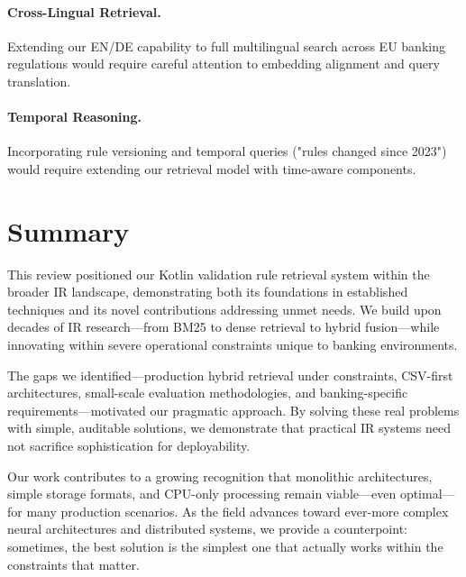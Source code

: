 \paragraph{Cross-Lingual Retrieval.} Extending our EN/DE capability to full multilingual search across EU banking regulations would require careful attention to embedding alignment and query translation.

\paragraph{Temporal Reasoning.} Incorporating rule versioning and temporal queries ("rules changed since 2023") would require extending our retrieval model with time-aware components.

\section{Summary}

This review positioned our Kotlin validation rule retrieval system within the broader IR landscape, demonstrating both its foundations in established techniques and its novel contributions addressing unmet needs. We build upon decades of IR research—from BM25 to dense retrieval to hybrid fusion—while innovating within severe operational constraints unique to banking environments.

The gaps we identified—production hybrid retrieval under constraints, CSV-first architectures, small-scale evaluation methodologies, and banking-specific requirements—motivated our pragmatic approach. By solving these real problems with simple, auditable solutions, we demonstrate that practical IR systems need not sacrifice sophistication for deployability.

Our work contributes to a growing recognition that monolithic architectures, simple storage formats, and CPU-only processing remain viable—even optimal—for many production scenarios. As the field advances toward ever-more complex neural architectures and distributed systems, we provide a counterpoint: sometimes, the best solution is the simplest one that actually works within the constraints that matter.